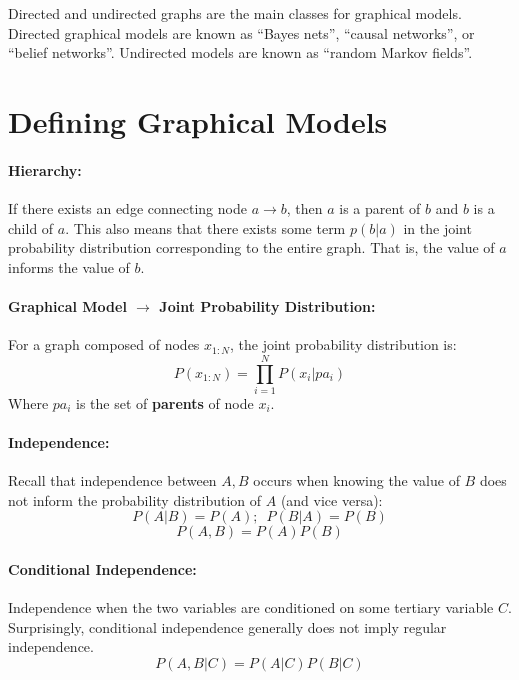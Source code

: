 \documentclass[a4paper,12pt]{report}
\begin{document}
Directed and undirected graphs are the main classes for graphical models. Directed graphical models are known as ``Bayes nets'', ``causal networks'', or ``belief networks''. Undirected models are known as ``random Markov fields''.


\section{Defining Graphical Models}

\paragraph{Hierarchy: } If there exists an edge connecting node $a\to b$, then $a$ is a parent of $b$ and $b$ is a child of $a$. This also means that there exists some term $p(b|a)$ in the joint probability distribution corresponding to the entire graph. That is, the value of $a$ informs the value of $b$.

\paragraph{Graphical Model $\to$ Joint Probability Distribution: } For a graph composed of nodes $x_{1:N}$, the joint probability distribution is:
\begin{equation}
P(x_{1:N}) = \prod_{i=1}^N P(x_i | pa_i)
\end{equation}
Where $pa_i$ is the set of \textbf{parents} of node $x_i$.


\paragraph{Independence: } Recall that independence between $A,B$ occurs when knowing the value of $B$ does not inform the probability distribution of $A$ (and vice versa):
\begin{equation}
P(A|B) = P(A); \,\,\, P(B|A) = P(B)
\end{equation}
\begin{equation}
P(A,B)= P(A)P(B)
\end{equation}
\paragraph{Conditional Independence: } Independence when the two variables are conditioned on some tertiary variable $C$. Surprisingly, conditional independence generally does not imply regular independence.
\begin{equation}
P(A,B|C) = P(A|C)P(B|C)
\end{equation}
\end{document}
